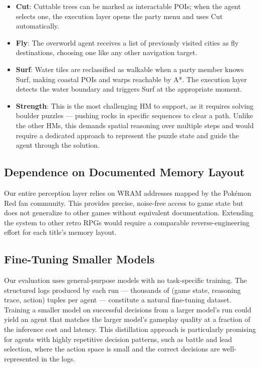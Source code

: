 \documentclass{article}
\begin{document}
\begin{itemize}
  \item \textbf{Cut}: Cuttable trees can be marked as interactable POIs; when the agent selects one, the execution layer opens the party menu and uses Cut automatically.
  \item \textbf{Fly}: The overworld agent receives a list of previously visited cities as fly destinations, choosing one like any other navigation target.
  \item \textbf{Surf}: Water tiles are reclassified as walkable when a party member knows Surf, making coastal POIs and warps reachable by A*. The execution layer detects the water boundary and triggers Surf at the appropriate moment.
  \item \textbf{Strength}: This is the most challenging HM to support, as it requires solving boulder puzzles --- pushing rocks in specific sequences to clear a path. Unlike the other HMs, this demands spatial reasoning over multiple steps and would require a dedicated approach to represent the puzzle state and guide the agent through the solution.
\end{itemize}

\subsection{Dependence on Documented Memory Layout}

Our entire perception layer relies on WRAM addresses mapped by the Pok\'{e}mon Red fan community. This provides precise, noise-free access to game state but does not generalize to other games without equivalent documentation. Extending the system to other retro RPGs would require a comparable reverse-engineering effort for each title's memory layout.

\subsection{Fine-Tuning Smaller Models}

Our evaluation uses general-purpose models with no task-specific training. The structured logs produced by each run --- thousands of (game state, reasoning trace, action) tuples per agent --- constitute a natural fine-tuning dataset. Training a smaller model on successful decisions from a larger model's run could yield an agent that matches the larger model's gameplay quality at a fraction of the inference cost and latency. This distillation approach is particularly promising for agents with highly repetitive decision patterns, such as battle and lead selection, where the action space is small and the correct decisions are well-represented in the logs.
\end{document}
